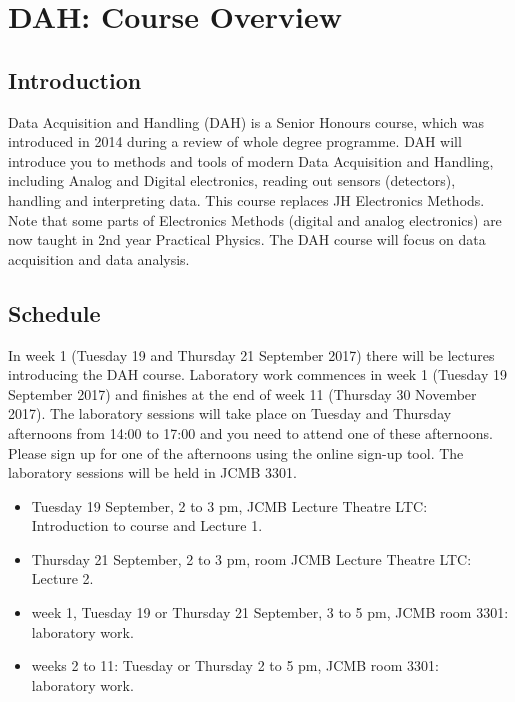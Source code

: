 \chapter{DAH: Course Overview}
\label{sec:overview}

\section{Introduction}

Data Acquisition and Handling (DAH) is a  Senior Honours course, which was introduced in 2014 during a review of whole degree programme. DAH will introduce you to methods and tools of modern Data Acquisition and Handling, including Analog and Digital electronics, reading out sensors (detectors), handling and interpreting data. This course replaces JH Electronics Methods. Note that some parts of Electronics Methods (digital and analog electronics) are now taught in 2nd year Practical Physics. The DAH course will focus on data acquisition and data analysis.


\section{Schedule}
In week 1 (Tuesday 19 and Thursday 21 September 2017)
there will be lectures %
introducing the DAH course.
Laboratory work commences in week 1 (Tuesday 19 September 2017) and finishes at the end of week 11 (Thursday 30 November 2017). The laboratory sessions will take place on Tuesday and Thursday afternoons from 14:00 to 17:00 and you need to attend one of these afternoons. Please sign up for one of the afternoons using the online sign-up tool. The laboratory sessions will be held in JCMB 3301.
\begin{itemize}
\item Tuesday 19 September, 2 to 3 pm,  JCMB Lecture Theatre LTC: \\Introduction to course and Lecture 1.
\item Thursday 21 September, 2 to 3 pm, room JCMB Lecture Theatre LTC: \\Lecture 2.
\item week 1, Tuesday 19  or Thursday  21 September, 3 to 5 pm, JCMB room 3301: \\laboratory work.
\item weeks 2 to 11:  Tuesday or Thursday 2 to 5 pm, JCMB room 3301: \\laboratory work.
\end{itemize}



